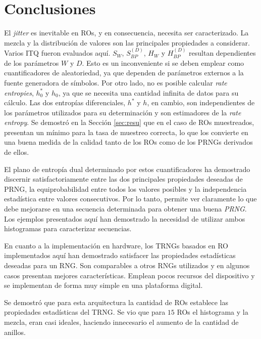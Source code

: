 \section{Conclusiones}

El \textit{jitter} es inevitable en {RO}s, y en consecuencia, necesita ser caracterizado.
La mezcla y la distribución de valores son las principales propiedades a considerar.
Varios {ITQ} fueron evaluados aquí.
$S_W$, $S^{(D)}_{BP}$, $H_W$ y $H^{(D)}_{BP}$ resultan dependientes de los parámetros $W$ y $D$.
Esto es un inconveniente si se deben emplear como cuantificadores de aleatoriedad, ya que dependen de parámetros externos a la fuente generadora de símbolos.
Por otro lado, no es posible calcular \emph{rate entropies}, $h_0^*$ y $h_0$, ya que se necesita una cantidad infinita de datos para su cálculo.
Las dos {entropías diferenciales}, $h^*$ y $h$, en cambio, son independientes de los parámetros utilizados para su determinación y son estimadores de la \emph{rate entropy}.
Se demostró en la Sección \ref{sec:resu} que en el caso de {RO}s muestreados, presentan un mínimo para la tasa de muestreo correcta, lo que los convierte en una buena medida de la calidad tanto de los {RO}s como de los {PRNG}s derivados de ellos.

El plano de entropía dual determinado por estos cuantificadores ha demostrado discernir satisfactoriamente entre las dos principales propiedades deseadas de {PRNG}, la equiprobabilidad entre todos los valores posibles y la independencia estadística entre valores consecutivos.
Por lo tanto, permite ver claramente lo que debe mejorarse en una secuencia determinada para obtener una buena \textit{PRNG}.
Los ejemplos presentados aquí han demostrado la necesidad de utilizar ambos histogramas para caracterizar secuencias.

En cuanto a la implementación en hardware, los {TRNG}s basados en {RO} implementados aquí han demostrado satisfacer las propiedades estadísticas deseadas para un {RNG}.
Son comparables a otros {RNG}s utilizados y en algunos casos presentan mejores características.
Emplean pocos recursos del dispositivo y se implementan de forma muy simple en una plataforma digital.

Se demostró que para esta arquitectura la cantidad de {RO}s establece las propiedades estadísticas del {TRNG}.
Se vio que para $15$ {RO}s el histograma y la mezcla, eran casi ideales, haciendo innecesario el aumento de la cantidad de anillos.